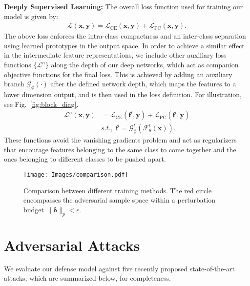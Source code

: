 \documentclass[10pt,twocolumn,letterpaper]{article}
\newcommand{\bdelta}{{\bm \delta}}
\begin{document}
\noindent \textbf{Deeply Supervised Learning:} 
The overall loss function used for training our model is given by:
\begin{align}
    \mathcal{L}(\bm{x},\bm{y}) = \mathcal{L}_{\text{CE}}(\bm{x},\bm{y}) +  \mathcal{L}_{\text{PC}}(\bm{x},\bm{y}).
\end{align}
The above loss enforces the intra-class compactness and an inter-class separation using learned prototypes in the output space. In order to achieve a similar effect in the intermediate feature representations, we include other auxiliary loss functions $\{ \mathcal{L}^n\}$ along the depth of our deep networks, which act as companion objective functions for the final loss. This is achieved by adding an auxiliary branch $\mathcal{G}_{\phi}(\cdot)$ after the defined network depth, which maps the features to a lower dimension output, and is then used in the loss definition. For illustration, see Fig.~\ref{fig:block_diag}.
\begin{align}
    \label{eq:auxiliary}
    \mathcal{L}^n(\bm{x}, \bm{y}) &= \mathcal{L}_{\text{CE}}(\bm{f}^l, \bm{y}) + \mathcal{L}_{\text{PC}}(\bm{f}^l,\bm{y})\\
    &s.t., \; \bm{f}^l = \mathcal{G}_{\phi}^l(\mathcal{F}^l_{\theta}(\bm{x})).  
\end{align}
These functions avoid the vanishing gradients problem and act as regularizers that encourage features belonging to the same class to come together and the ones belonging to different classes to be pushed apart. 

\begin{figure}[t] 
    \centering
   {\texttt{[image: Images/comparison.pdf]}}\vspace{-0.5em}
    \caption{\small{Comparison between different training methods. The red circle encompasses the adversarial sample space within a perturbation budget ${\parallel}\bdelta{\parallel}_p < \epsilon$.}} \vspace{-1.25em}
    \label{fig:toy-fig}
\end{figure}

\section{Adversarial Attacks}
\label{subsec:attacks}

We evaluate our defense model against five recently proposed state-of-the-art attacks, which are summarized below, for completeness.\medskip  \\
\vspace{-1.0em}
\end{document}
